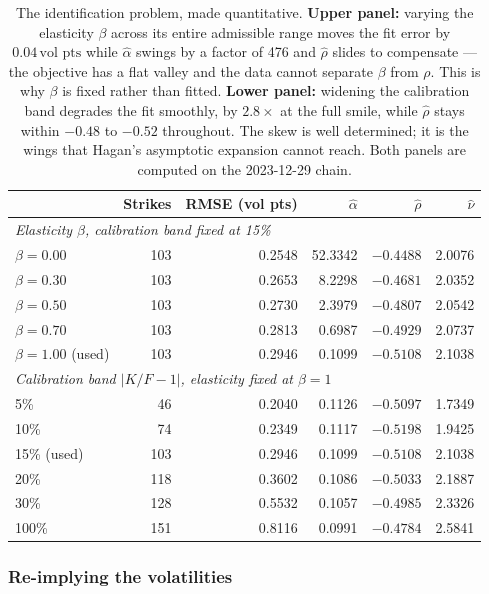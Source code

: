\documentclass[11pt]{article}
\newcommand{\vp}{\,\text{vol pts}}
\begin{document}
\begin{table}[t]
\centering
\small
\caption{The identification problem, made quantitative. \textbf{Upper panel:} varying the
elasticity $\beta$ across its entire admissible range moves the fit error by $0.04\vp$
while $\hat{\alpha}$ swings by a factor of 476 and $\hat{\rho}$ slides to compensate ---
the objective has a flat valley and the data cannot separate $\beta$ from $\rho$. This
is why $\beta$ is fixed rather than fitted. \textbf{Lower panel:} widening the
calibration band degrades the fit smoothly, by $2.8\times$ at the full smile, while
$\hat{\rho}$ stays within $-0.48$ to $-0.52$ throughout. The skew is well determined; it
is the wings that Hagan's asymptotic expansion cannot reach. Both panels are computed on
the 2023-12-29 chain.}
\label{tab:ident}
\begin{tabular}{lrrrrr}
\toprule
 & Strikes & RMSE (vol pts) & $\hat{\alpha}$ & $\hat{\rho}$ & $\hat{\nu}$ \\
\midrule
\multicolumn{6}{l}{\emph{Elasticity $\beta$, calibration band fixed at 15\%}}\\
$\beta=0.00$ & 103 & 0.2548 & 52.3342 & $-0.4488$ & 2.0076 \\
$\beta=0.30$ & 103 & 0.2653 &  8.2298 & $-0.4681$ & 2.0352 \\
$\beta=0.50$ & 103 & 0.2730 &  2.3979 & $-0.4807$ & 2.0542 \\
$\beta=0.70$ & 103 & 0.2813 &  0.6987 & $-0.4929$ & 2.0737 \\
$\beta=1.00$ (used) & 103 & 0.2946 & 0.1099 & $-0.5108$ & 2.1038 \\
\midrule
\multicolumn{6}{l}{\emph{Calibration band $|K/F-1|$, elasticity fixed at $\beta=1$}}\\
5\%   &  46 & 0.2040 & 0.1126 & $-0.5097$ & 1.7349 \\
10\%  &  74 & 0.2349 & 0.1117 & $-0.5198$ & 1.9425 \\
15\% (used) & 103 & 0.2946 & 0.1099 & $-0.5108$ & 2.1038 \\
20\%  & 118 & 0.3602 & 0.1086 & $-0.5033$ & 2.1887 \\
30\%  & 128 & 0.5532 & 0.1057 & $-0.4985$ & 2.3326 \\
100\% & 151 & 0.8116 & 0.0991 & $-0.4784$ & 2.5841 \\
\bottomrule
\end{tabular}
\end{table}

\subsubsection{Re-implying the volatilities}
\label{sec:reimply}
\end{document}
